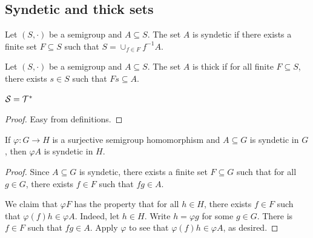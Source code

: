\subsection{Syndetic and thick sets}

\begin{definition}
\label{def_syndetic}
\leanok{}
Let $(S,\cdot)$ be a semigroup and $A \subseteq S$.  The set $A$ is syndetic if there exists a finite set $F \subseteq S$ such that $S = \cup_{f \in F} f^{-1} A$.
\end{definition}

\begin{definition}
\label{def_thick}
\leanok{}
Let $(S,\cdot)$ be a semigroup and $A \subseteq S$. The set $A$ is thick if for all finite $F \subseteq S$, there exists $s \in S$ such that $Fs \subseteq A$.
\end{definition}

\begin{lemma}
    \label{lemma_synd_thick_dual}
    \leanok{}
    $\mathcal{S} = \mathcal{T}^*$
\end{lemma}

\begin{proof}
\leanok{}
    Easy from definitions.
\end{proof}



\begin{lemma}
    \label{lemma_image_of_syndetic}
    \leanok{}
    If $\varphi: G \to H$ is a surjective semigroup homomorphism and $A \subseteq G$ is syndetic in $G$, then $\varphi A$ is syndetic in $H$.
\end{lemma}

\begin{proof}
\leanok{}
    Since $A \subseteq G$ is syndetic, there exists a finite set $F \subseteq G$ such that for all $g \in G$, there exists $f \in F$ such that $fg \in A$.

    We claim that $\varphi F$ has the property that for all $h \in H$, there exists $f \in F$ such that $\varphi(f)h \in \varphi A$.  Indeed, let $h \in H$.  Write $h = \varphi g$ for some $g \in G$.  There is $f \in F$ such that $fg \in A$.  Apply $\varphi$ to see that $\varphi(f) h \in \varphi A$, as desired.
\end{proof}

